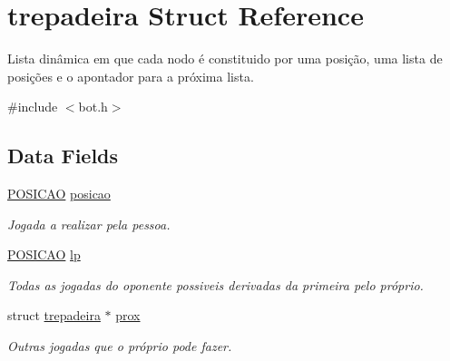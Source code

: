 \hypertarget{structtrepadeira}{}\section{trepadeira Struct Reference}
\label{structtrepadeira}


Lista dinâmica em que cada nodo é constituido por uma posição, uma lista de posições e o apontador para a próxima lista.  




{\ttfamily \#include $<$bot.\+h$>$}

\subsection*{Data Fields}
\begin{DoxyCompactItemize}
\item 
\mbox{\label{structtrepadeira_a97ebacdec2eb0931913ecd80349b7ea6}} 
\hyperlink{estado_8h_a6f525b62d555e8296fd18fa45b7b9497}{P\+O\+S\+I\+C\+AO} \hyperlink{structtrepadeira_a97ebacdec2eb0931913ecd80349b7ea6}{posicao}
\begin{DoxyCompactList}\small\item\em Jogada a realizar pela pessoa. \end{DoxyCompactList}\item 
\mbox{\label{structtrepadeira_ad5240a7c37ca3fafed09e4785fa5262f}} 
\hyperlink{estado_8h_a6f525b62d555e8296fd18fa45b7b9497}{P\+O\+S\+I\+C\+AO} \hyperlink{structtrepadeira_ad5240a7c37ca3fafed09e4785fa5262f}{lp}
\begin{DoxyCompactList}\small\item\em Todas as jogadas do oponente possiveis derivadas da primeira pelo próprio. \end{DoxyCompactList}\item 
\mbox{\label{structtrepadeira_a6f2e25a90c4c8d7ba46e6e631216f05e}} 
struct \hyperlink{structtrepadeira}{trepadeira} $\ast$ \hyperlink{structtrepadeira_a6f2e25a90c4c8d7ba46e6e631216f05e}{prox}
\begin{DoxyCompactList}\small\item\em Outras jogadas que o próprio pode fazer. \end{DoxyCompactList}\end{DoxyCompactItemize}


